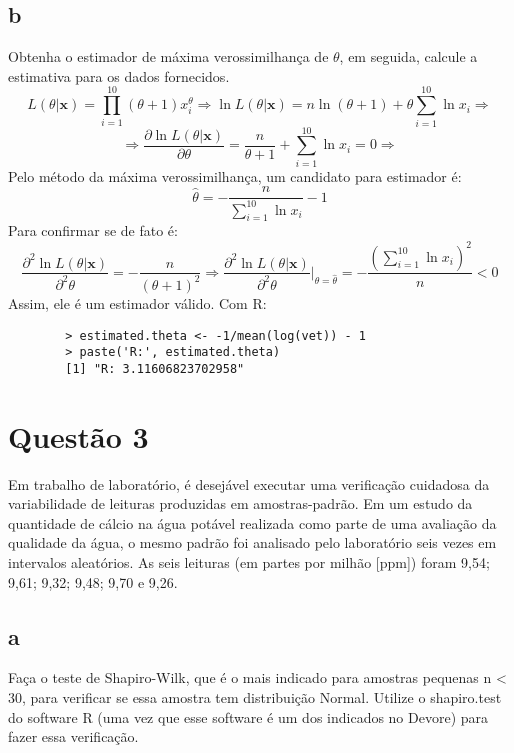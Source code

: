 \documentclass{article}[twocolumn]
\begin{document}
	\subsection{b}
	Obtenha o estimador de máxima verossimilhança de $\theta$, em seguida, calcule a estimativa
	para os dados fornecidos.
	\begin{equation}
		L(\theta | \mathbf{x}) = \prod_{i = 1}^{10}(\theta + 1)x_i^\theta \Rightarrow
		\ln L(\theta | \mathbf{x}) = n\ln(\theta + 1) + \theta\sum_{i = 1}^{10}\ln x_i
		\Rightarrow
		\nonumber
	\end{equation}
	\begin{equation}
		\Rightarrow \frac{\partial \ln L(\theta | \mathbf{x})}{\partial \theta} =
		\frac{n}{\theta + 1} + \sum_{i = 1}^{10}\ln x_i = 0 \Rightarrow
		\nonumber
	\end{equation}
	Pelo m\'etodo da m\'axima verossimilhan\c{c}a, um candidato para estimador \'e:
	\begin{equation}
		\hat{\theta} = -\frac{n}{\sum_{i = 1}^{10}\ln x_i} - 1
		\nonumber
	\end{equation}
	Para confirmar se de fato \'e:
	\begin{equation}
		\frac{\partial^2 \ln L(\theta | \mathbf{x})}{\partial^2 \theta} =
		-\frac{n}{(\theta + 1)^2} \Rightarrow
		\frac{\partial^2 \ln L(\theta | \mathbf{x})}{\partial^2 \theta}\big|_{\theta = \hat{\theta}}
		= -\frac{\left(\sum_{i = 1}^{10}\ln x_i\right)^2}{n} < 0
		\nonumber
	\end{equation}
	Assim, ele \'e um estimador v\'alido. Com R:
	\begin{verbatim}
		> estimated.theta <- -1/mean(log(vet)) - 1
		> paste('R:', estimated.theta)
		[1] "R: 3.11606823702958"
	\end{verbatim}
	\section{Quest\~ao 3}
	Em trabalho de laboratório, é desejável executar uma verificação cuidadosa da
	variabilidade de leituras produzidas em amostras-padrão. Em um estudo da quantidade
	de cálcio na água potável realizada como parte de uma avaliação da qualidade da água, o
	mesmo padrão foi analisado pelo laboratório seis vezes em intervalos aleatórios. As seis
	leituras (em partes por milhão [ppm]) foram 9,54; 9,61; 9,32; 9,48; 9,70 e 9,26.
	\subsection{a}
	Faça o teste de Shapiro-Wilk, que é o mais indicado para amostras pequenas n < 30,
	para verificar se essa amostra tem distribuição Normal. Utilize o shapiro.test do
	software R (uma vez que esse software é um dos indicados no Devore) para fazer essa
	verificação.
\end{document}
